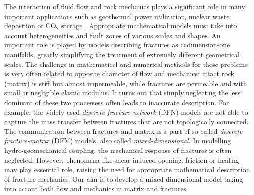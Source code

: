 \documentclass[a4paper]{m2an}
\numberwithin{equation}{section}
\begin{document}


The interaction of fluid flow and rock mechanics plays a significant role in many important applications such as geothermal power utilization, nuclear waste deposition or CO${}_2$ storage \cite{rutqvist2003role}.
Appropriate mathematical models must take into account heterogeneities and fault zones of various scales and shapes.
An important role is played by models describing fractures as codimension-one manifolds, greatly simplifying the treatment of extremely different geometrical scales.
The challenge in mathematical and numerical methods for these problems is very often related to opposite character of flow and mechanics: intact rock (matrix) is stiff but almost impermeable, while fractures are permeable and with small or negligible elastic modulus.
It turns out that simply neglecting the less dominant of these two processess often leads to inaccurate description.
For example, the widely-used \textit{discrete fracture network} (DFN) models are not able to capture the mass transfer between fractures that are not topologically connected.
The communication between fractures and matrix is a part of so-called \textit{discrete fracture-matrix} (DFM) models, also called \textit{mixed-dimensional}.
In modelling hydro-geomechanical coupling, the mechanical response of fractures is often neglected.
However, phenomena like shear-induced opening, friction or healing may play essential role, raising the need for appropriate mathematical description of fracture mechanics.
Our aim is to develop a mixed-dimensional model taking into accout both flow and mechanics in matrix and fractures.
\end{document}
